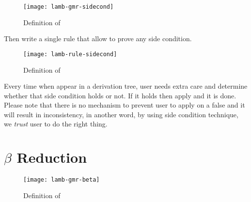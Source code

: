\documentclass[master.tex]{subfiles}
\begin{document}
\begin{figure}[H]
    \centering
\begin{minipage}{0.7\textwidth}
    \texttt{[image: lamb-gmr-sidecond]}
\end{minipage}
\caption{Definition of }
\end{figure}

Then write a single rule that allow to prove any side condition.

\begin{figure}[H]
    \centering
\begin{minipage}{0.7\textwidth}
    \texttt{[image: lamb-rule-sidecond]}
\end{minipage}
\caption{Definition of }
\end{figure}

Every time when  appear in a derivation tree, user needs
extra care and determine whether that side condition holds or not. If it holds
then apply  and it is done. Please note that there is no
mechanism to prevent user to apply  on a false
 and it will result in inconsistency, in another word, by
using side condition technique, we \emph{trust} user to do the right thing.

\section{$\beta$ Reduction}

\begin{figure}[H]
    \centering
\begin{minipage}{0.7\textwidth}
    \texttt{[image: lamb-gmr-beta]}
\end{minipage}
\caption{Definition of }
\end{figure}
\end{document}
